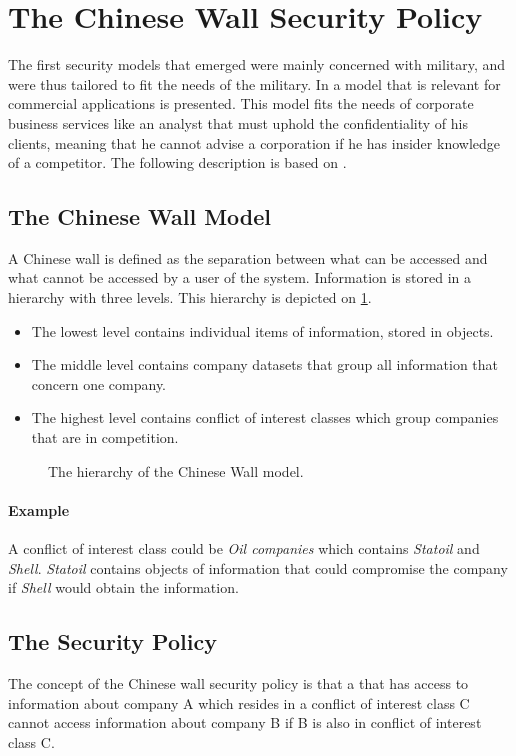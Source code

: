 \section{The Chinese Wall Security Policy}

The first security models that emerged were mainly concerned with military, and were thus tailored to fit the needs of the military. 
In \cite{brewer1989chinese} a model that is relevant for commercial applications is presented.
This model fits the needs of corporate business services like an analyst that must uphold the confidentiality of his clients, meaning that he cannot advise a corporation if he has insider knowledge of a competitor.
The following description is based on \citet{brewer1989chinese}.

\subsection*{The Chinese Wall Model}
A Chinese wall is defined as the separation between what can be accessed and what cannot be accessed by a user of the system.
Information is stored in a hierarchy with three levels. 
This hierarchy is depicted on \cref{hierarchy}.

\begin{itemize}
	\item The lowest level contains individual items of information, stored in objects.
	\item The middle level contains company datasets that group all information that concern one company. 
	\item The highest level contains conflict of interest classes which group companies that are in competition.
\end{itemize}

\begin{figure}[h]
  \resizebox{\textwidth}{!}{
	}
	\caption{The hierarchy of the Chinese Wall model.}
	\label{hierarchy}
\end{figure}

\paragraph{Example} A conflict of interest class could be \emph{Oil companies} which contains \emph{Statoil} and \emph{Shell}. \emph{Statoil} contains objects of information that could compromise the company if \emph{Shell} would obtain the information.

\subsection{The Security Policy}
The concept of the Chinese wall security policy is that a \principal{} that has access to information about company A which resides in a conflict of interest class C cannot access information about company B if B is also in conflict of interest class C.

